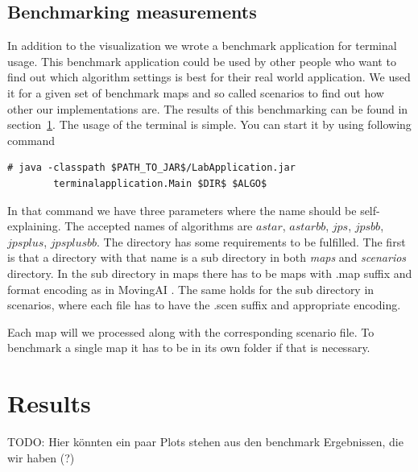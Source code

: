 \documentclass{article}
\begin{document}
    \subsection{Benchmarking measurements}

    In addition to the visualization we wrote a benchmark application for terminal usage. This benchmark application could be used by other people who want to find out which algorithm settings is best for their real world application. We used it for a given set of benchmark maps and so called scenarios to find out how other our implementations are. The results of this benchmarking can be found in section~\ref{sec:results}. The usage of the terminal is simple. You can start it by using following command

    \begin{lstlisting}[basicstyle=\small\ttfamily]
      # java -classpath $PATH_TO_JAR$/LabApplication.jar
        terminalapplication.Main $DIR$ $ALGO$
    \end{lstlisting}

    In that command we have three parameters where the name should be self-explaining. The accepted names of algorithms are $astar$, $astarbb$, $jps$, $jpsbb$, $jpsplus$, $jpsplusbb$. The directory has some requirements to be fulfilled. The first is that a directory with that name is a sub directory in both \textit{maps} and \textit{scenarios} directory. In the sub directory in maps there has to be maps with .map suffix and format encoding as in MovingAI \cite{sturtevant2012benchmarks}. The same holds for the sub directory in scenarios, where each file has to have the .scen suffix and appropriate encoding.

    Each map will we processed along with the corresponding scenario file. To benchmark a single map it has to be in its own folder if that is necessary.



    \section{Results}
    \label{sec:results}

    TODO: Hier könnten ein paar Plots stehen aus den benchmark Ergebnissen, die wir haben (?)

    \cite{sturtevant2012benchmarks}


    
    
\end{document}

